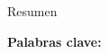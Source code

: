 \begin{center}
\Large{Resumen}
\end{center}

\bigskip


\bigskip
\bigskip
\bigskip

\textbf{Palabras clave:} %